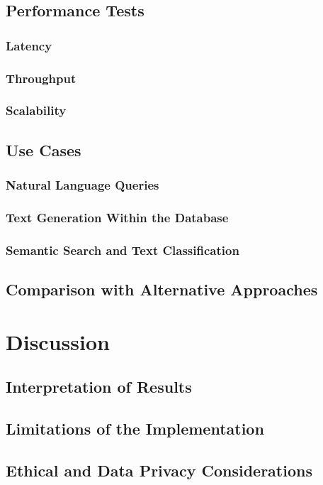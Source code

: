 \documentclass{article}
\begin{document}
\subsection{Performance Tests}
\subsubsection{Latency}
\subsubsection{Throughput}
\subsubsection{Scalability}

\subsection{Use Cases}
\subsubsection{Natural Language Queries}
\subsubsection{Text Generation Within the Database}
\subsubsection{Semantic Search and Text Classification}

\subsection{Comparison with Alternative Approaches}

\newpage

\section{Discussion}

\subsection{Interpretation of Results}
\subsection{Limitations of the Implementation}
\subsection{Ethical and Data Privacy Considerations}
\end{document}
